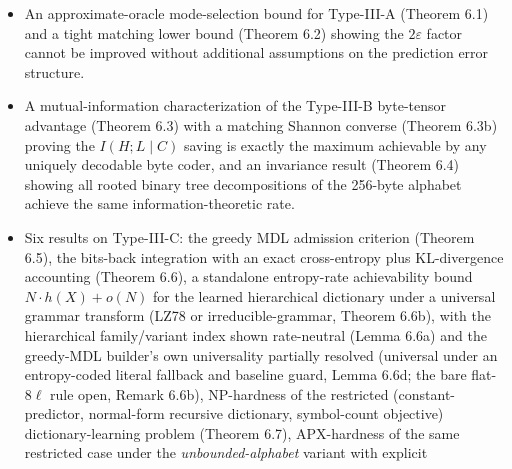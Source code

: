 \documentclass[
]{article}
\begin{document}
\begin{itemize}
  not just marginals --- and a concrete counterexample (at $N=7$,
  $k_v=2$, $s=2$) is included in the paper's verification scripts.
  Lemma 5.7a recovers optimality of top-$Q$ for the
  \emph{permutation-like} (conditional Bernoulli) class of joint laws
  where atom weights factorize as $\Pr(M_v = T) \propto
  \prod_{i \in T} q_i$ (covering the uniform-on-fixed-cardinality
  and log-likelihood-weighted regimes), via a stochastic dominance
  coupling. Lemma 5.7c then closes the complementary direction:
  optimal fixed-size support selection for arbitrary joint laws is
  NP-hard, via a CLIQUE-to-support-selection reduction at $N=3s+1$
  where the algebraic identity $A_s(1) = A_s(2)$ collapses the
  cost to a linear function of the densest-$k$-subgraph value
  $n_0(S)$. Together Lemma 5.7a and Lemma 5.7c form a polynomial-time
  vs.\ NP-hard dichotomy in the joint law's permutation-like structure.
\item
  An approximate-oracle mode-selection bound for Type-III-A (Theorem
  6.1) and a tight matching lower bound (Theorem 6.2) showing the
  $2\varepsilon$ factor cannot be improved without additional
  assumptions on the prediction error structure.
\item
  A mutual-information characterization of the Type-III-B byte-tensor
  advantage (Theorem 6.3) with a matching Shannon converse
  (Theorem 6.3b) proving the $I(H;L\mid C)$ saving is exactly the
  maximum achievable by any uniquely decodable byte coder, and an
  invariance result (Theorem 6.4) showing all rooted binary tree
  decompositions of the 256-byte alphabet achieve the same
  information-theoretic rate.
\item
  Six results on Type-III-C: the greedy MDL admission criterion
  (Theorem 6.5), the bits-back integration with an exact
  cross-entropy plus KL-divergence accounting (Theorem 6.6), a
  standalone entropy-rate achievability bound $N \cdot h(X) + o(N)$ for
  the learned hierarchical dictionary under a universal grammar
  transform (LZ78 or irreducible-grammar, Theorem 6.6b), with the
  hierarchical family/variant index shown rate-neutral (Lemma 6.6a) and
  the greedy-MDL builder's own universality partially resolved (universal
  under an entropy-coded literal fallback and baseline guard, Lemma 6.6d;
  the bare flat-$8\ell$ rule open, Remark 6.6b),
  NP-hardness of the restricted (constant-predictor, normal-form
  recursive dictionary, symbol-count objective) dictionary-learning
  problem (Theorem 6.7), APX-hardness of the same restricted
  case under the \emph{unbounded-alphabet} variant with explicit

\end{itemize}
\end{document}
